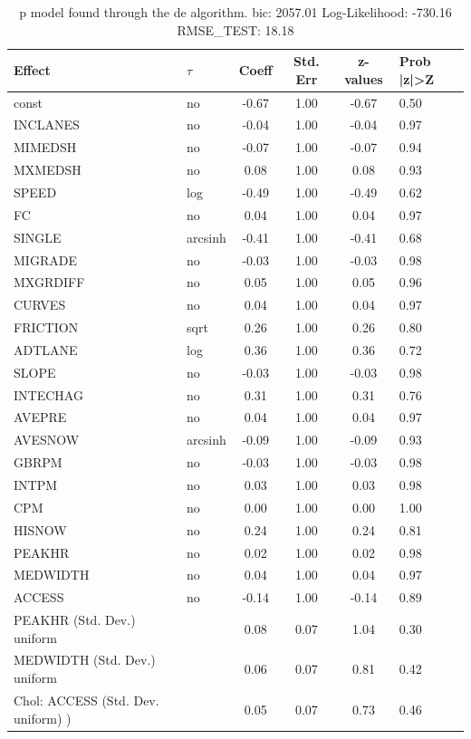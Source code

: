 \begin{table}
	\caption{p model found through the de algorithm. bic: 2057.01 Log-Likelihood: -730.16 RMSE_TEST: 18.18}
	\begin{center}
		\begin{tabular}{|l|l|c|c|c|l|}
			\hline
			Effect & $\tau$ & Coeff & Std. Err & z-values & Prob |z|>Z \\
			\hline
			const & no & -0.67 & 1.00 & -0.67 & 0.50 \\
			\hline
			INCLANES & no & -0.04 & 1.00 & -0.04 & 0.97 \\
			\hline
			MIMEDSH & no & -0.07 & 1.00 & -0.07 & 0.94 \\
			\hline
			MXMEDSH & no & 0.08 & 1.00 & 0.08 & 0.93 \\
			\hline
			SPEED & log & -0.49 & 1.00 & -0.49 & 0.62 \\
			\hline
			FC & no & 0.04 & 1.00 & 0.04 & 0.97 \\
			\hline
			SINGLE & arcsinh & -0.41 & 1.00 & -0.41 & 0.68 \\
			\hline
			MIGRADE & no & -0.03 & 1.00 & -0.03 & 0.98 \\
			\hline
			MXGRDIFF & no & 0.05 & 1.00 & 0.05 & 0.96 \\
			\hline
			CURVES & no & 0.04 & 1.00 & 0.04 & 0.97 \\
			\hline
			FRICTION & sqrt & 0.26 & 1.00 & 0.26 & 0.80 \\
			\hline
			ADTLANE & log & 0.36 & 1.00 & 0.36 & 0.72 \\
			\hline
			SLOPE & no & -0.03 & 1.00 & -0.03 & 0.98 \\
			\hline
			INTECHAG & no & 0.31 & 1.00 & 0.31 & 0.76 \\
			\hline
			AVEPRE & no & 0.04 & 1.00 & 0.04 & 0.97 \\
			\hline
			AVESNOW & arcsinh & -0.09 & 1.00 & -0.09 & 0.93 \\
			\hline
			GBRPM & no & -0.03 & 1.00 & -0.03 & 0.98 \\
			\hline
			INTPM & no & 0.03 & 1.00 & 0.03 & 0.98 \\
			\hline
			CPM & no & 0.00 & 1.00 & 0.00 & 1.00 \\
			\hline
			HISNOW & no & 0.24 & 1.00 & 0.24 & 0.81 \\
			\hline
			PEAKHR & no & 0.02 & 1.00 & 0.02 & 0.98 \\
			\hline
			MEDWIDTH & no & 0.04 & 1.00 & 0.04 & 0.97 \\
			\hline
			ACCESS & no & -0.14 & 1.00 & -0.14 & 0.89 \\
			\hline
			PEAKHR (Std. Dev.) uniform &  & 0.08 & 0.07 & 1.04 & 0.30 \\
			\hline
			MEDWIDTH (Std. Dev.) uniform &  & 0.06 & 0.07 & 0.81 & 0.42 \\
			\hline
			 Chol: ACCESS (Std. Dev. uniform) ) &  & 0.05 & 0.07 & 0.73 & 0.46 \\
			\hline
		\end{tabular}
	\end{center}
\end{table}